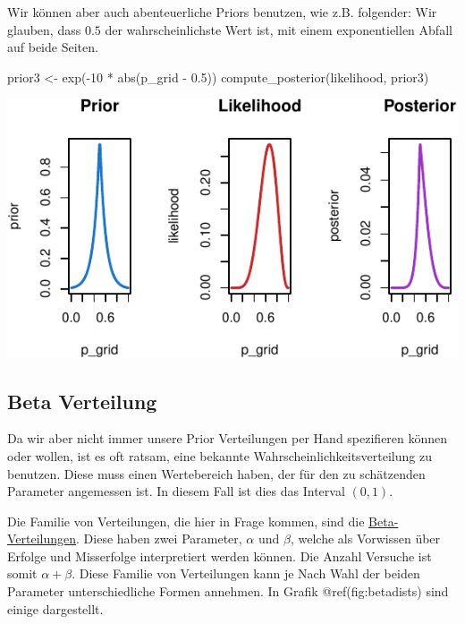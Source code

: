 \documentclass[]{tufte-handout}
\newenvironment{Shaded}{}{}
\newcommand{\DecValTok}[1]{\textcolor[rgb]{0.25,0.63,0.44}{#1}}
\newcommand{\FloatTok}[1]{\textcolor[rgb]{0.25,0.63,0.44}{#1}}
\newcommand{\FunctionTok}[1]{\textcolor[rgb]{0.02,0.16,0.49}{#1}}
\newcommand{\NormalTok}[1]{#1}
\newcommand{\OtherTok}[1]{\textcolor[rgb]{0.00,0.44,0.13}{#1}}
\newcommand{\SpecialCharTok}[1]{\textcolor[rgb]{0.25,0.44,0.63}{#1}}
\begin{document}
Wir können aber auch abenteuerliche Priors benutzen, wie z.B. folgender:
Wir glauben, dass \(0.5\) der wahrscheinlichste Wert ist, mit einem
exponentiellen Abfall auf beide Seiten.

\begin{Shaded}
\begin{Highlighting}[]
\NormalTok{prior3 }\OtherTok{\textless{}{-}} \FunctionTok{exp}\NormalTok{(}\SpecialCharTok{{-}}\DecValTok{10} \SpecialCharTok{*} \FunctionTok{abs}\NormalTok{(p\_grid }\SpecialCharTok{{-}} \FloatTok{0.5}\NormalTok{))}
\FunctionTok{compute\_posterior}\NormalTok{(likelihood, prior3)}
\end{Highlighting}
\end{Shaded}

\includegraphics{01-intro-bayesian-stats_files/figure-latex/unnamed-chunk-19-1}

\hypertarget{beta-verteilung}{%
\subsection{Beta Verteilung}\label{beta-verteilung}}

Da wir aber nicht immer unsere Prior Verteilungen per Hand spezifieren
können oder wollen, ist es oft ratsam, eine bekannte
Wahrscheinlichkeitsverteilung zu benutzen. Diese muss einen Wertebereich
haben, der für den zu schätzenden Parameter angemessen ist. In diesem
Fall ist dies das Interval \(\left(0, 1\right)\).

Die Familie von Verteilungen, die hier in Frage kommen, sind die
\href{https://de.wikipedia.org/wiki/Beta-Verteilung}{Beta-Verteilungen}.
Diese haben zwei Parameter, \(\alpha\) und \(\beta\), welche als
Vorwissen über Erfolge und Misserfolge interpretiert werden können. Die
Anzahl Versuche ist somit \(\alpha + \beta\). Diese Familie von
Verteilungen kann je Nach Wahl der beiden Parameter unterschiedliche
Formen annehmen. In Grafik @ref(fig:betadists) sind einige dargestellt.
\end{document}
